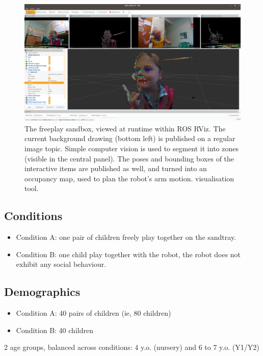 \documentclass{article}
\begin{document}
\begin{figure}
    \centering
    \includegraphics[width=0.9\linewidth]{3d-point-cloud-facial-features}
    \caption{The freeplay sandbox, viewed at runtime within ROS RViz. The
    current background drawing (bottom left) is published on a regular image
    topic. Simple computer vision is used to segment it into zones (visible in
    the central panel). The poses and bounding boxes of the interactive items
    are published as well, and turned into an occupancy map, used to plan the
    robot's arm motion.
    visualisation tool.}
    \label{fig|rviz}
\end{figure}

\subsection{Conditions}\label{conditions}

\begin{itemize}
\item
  Condition A: one pair of children freely play together on the
  sandtray.
\item
  Condition B: one child play together with the robot, the robot does
  not exhibit any social behaviour.
\end{itemize}

\subsection{Demographics}\label{demographics}

\begin{itemize}
\item
  Condition A: 40 pairs of children (ie, 80 children)
\item
  Condition B: 40 children
\end{itemize}

2 age groups, balanced across conditions: 4 y.o. (nursery) and 6 to 7
y.o. (Y1/Y2)
\end{document}
